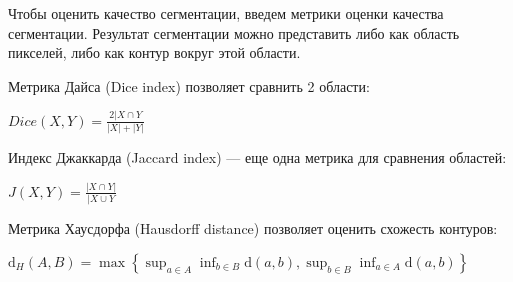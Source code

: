 Чтобы оценить качество сегментации, введем метрики оценки качества сегментации. Результат сегментации можно представить либо как область пикселей, либо как контур вокруг этой области. 

Метрика Дайса (Dice index) позволяет сравнить 2 области:

$Dice(X,Y) = \frac{2|X\cap{}Y}{|X| + |Y|}$

Индекс Джаккарда (Jaccard index) — еще одна метрика для сравнения областей:

$J(X,Y) = \frac{|X\cap{}Y|}{|X\cup{}Y}$

Метрика Хаусдорфа (Hausdorff distance) позволяет оценить схожесть контуров:

$\mathrm{d}_{H}(A,B)=\max\left\{\sup_{a\in{}A}\inf_{b\in{}B}\mathrm{d}(a,b),\sup_{b\in{}B}\inf_{a\in{}A}\mathrm{d}(a,b)\right\}$


